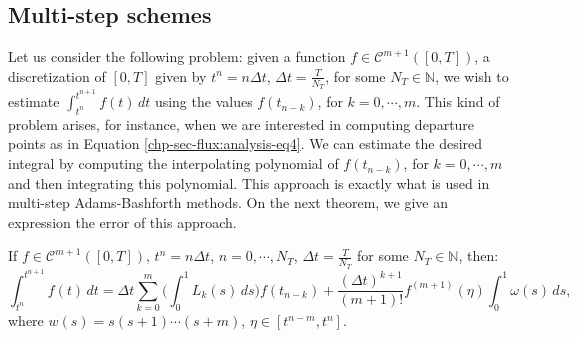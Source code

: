 \subsection{Multi-step schemes}
Let us consider the following problem: given a function $f \in \mathcal{C}^{m+1}([0,T])$,
a discretization of $[0,T]$ given by $t^n= n\Delta t$, $\Delta t = \frac{T}{N_T}$, for some $N_T \in \mathbb{N}$, we wish
to estimate $\int_{t^n}^{t^{n+1}} f(t)\,dt$ using the values $f(t_{n-k})$, for $k=0,\cdots, m$.
This kind of problem arises, for instance, when we are interested in computing departure points as in Equation \ref{chp-sec-flux:analysis-eq4}.
We can estimate the desired integral by computing the interpolating polynomial of $f(t_{n-k})$, for $k=0,\cdots, m$ and
then integrating this polynomial.
This approach is exactly what is used in multi-step Adams-Bashforth methods.
On the next theorem, we give an expression the error of this approach.

\begin{thrm}
	\label{anexo-numint-adams}
	If $f\in \mathcal{C}^{m+1}([0,T])$, $t^n = n\Delta t$, $n=0, \cdots, N_T$, $\Delta t = \frac{T}{N_T}$ for some 
	$N_T \in \mathbb{N}$, then:
	\begin{equation}
		\label{anexo-numint-eq0}
		\int_{t^n}^{t^{n+1}} f(t)\,dt = \Delta t \sum_{k=0}^{m} \bigg(\int_{0}^{1} L_k(s) \,ds \bigg) f(t_{n-k})
		+ \frac{(\Delta t)^{k+1}}{(m+1)!} f^{(m+1)}(\eta)\int_{0}^{1} \omega(s)\,ds, 
	\end{equation}
	where $w(s) = s(s+1)\cdots(s+m)$, $\eta \in [t^{n-m}, t^{n}]$.
\end{thrm}

